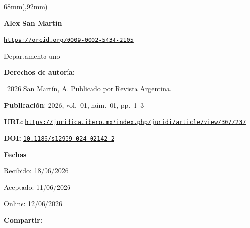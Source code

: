 \documentclass{article}
\newlength{\gbbloquex}
\begin{document}
\begin{textblock*}{68mm}(\gbbloquex,92mm)
{\setlength{\leftskip}{0pt}\setlength{\parindent}{0pt}%
\noindent\begin{minipage}[t]{68mm}
\sffamily\small\setlength{\parskip}{1pt}
{\bfseries\color{azulrevista}Alex San Martín}\par
{\scriptsize\texttt{\href{https://orcid.org/0009-0002-5434-2105}{https://orcid.org/0009-0002-5434-2105}}}\par
Departamento uno\par
\vspace{6pt}
{\bfseries\color{azulrevista!70}Derechos de autor\'ia:}\par
\textcopyright\ 2026 San Martín, A. Publicado por Revista Argentina. \par\vspace{6pt}
{\bfseries\color{azulrevista!70}Publicación:} 2026, vol.~01, n\'um.~01, pp.~1--3\par\vspace{6pt}
{\bfseries\color{azulrevista!70}URL:} {\scriptsize\texttt{\href{https://juridica.ibero.mx/index.php/juridi/article/view/307/237}{https://juridica.ibero.mx/index.php/juridi/article/view/307/237}}}\par\vspace{6pt}
{\bfseries\color{azulrevista!70}DOI:} {\scriptsize\texttt{\href{https://doi.org/10.1186/s12939-024-02142-2}{10.1186/s12939-024-02142-2}}}\par\vspace{6pt}
{\bfseries\color{azulrevista!70}Fechas}\par\vspace{2pt}
Recibido: 18/06/2026\par
Aceptado: 11/06/2026\par
Online: 12/06/2026\par
\vspace{6pt}
\vspace{6pt}
{\bfseries\color{azulrevista!70}Compartir:}\par\vspace{3pt}
{\large
\href{https://bsky.app/intent/compose?text=https%3A%2F%2Fjuridica.ibero.mx%2Findex.php%2Fjuridi%2Farticle%2Fview%2F307%2F237}{}~
\href{mailto:?subject=Rese%C3%B1a%20editorial&body=https%3A%2F%2Fjuridica.ibero.mx%2Findex.php%2Fjuridi%2Farticle%2Fview%2F307%2F237}{}~
\href{https://www.facebook.com/sharer/sharer.php?u=https%3A%2F%2Fjuridica.ibero.mx%2Findex.php%2Fjuridi%2Farticle%2Fview%2F307%2F237}{}~
}
\end{minipage}}
\end{textblock*}
\end{document}
